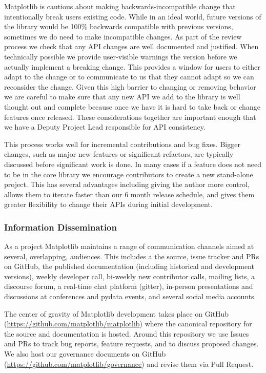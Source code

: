 \documentclass[12pt]{article}
\numberwithin{page}{section}
\begin{document}
Matplotlib is cautious about making backwards-incompatible change that
intentionally break users existing code.  While in an ideal world, future
versions of the library would be 100\% backwards compatible with previous
versions, sometimes we do need to make incompatible changes.  As part of the
review process we check that any API changes are well documented and justified.
When technically possible we provide user-visible warnings the version before
we actually implement a breaking change.  This provides a window for users to
either adapt to the change or to communicate to us that they cannot adapt so we
can reconsider the change.  Given this high barrier to changing or removing
behavior we are careful to make sure that any new API we add to the library is
well thought out and complete because once we have it is hard to take back or
change features once released.  These considerations together are important
enough that we have a Deputy Project Lead responsible for API consistency.

This process works well for incremental contributions and bug fixes.  Bigger
changes, such as major new features or significant refactors, are typically
discussed before significant work is done.  In many cases if a feature does not
need to be in the core library we encourage contributors to create a new
stand-alone project.  This has several advantages including giving the
author more control, allows them to iterate faster than our 6 month release
schedule, and gives them greater flexibility to change their APIs during
initial development.

\subsubsection{Information Dissemination}

As a project Matplotlib maintains a range of communication channels
aimed at several, overlapping, audiences.  This includes a
the source, issue tracker and PRs on GitHub,
the published documentation (including historical and development versions),
weekly developer call,
bi-weekly new contributor calls,
mailing lists,
a discourse forum,
a real-time chat platform (gitter),
in-person presentations and discussions at conferences and pydata events,
and several social media accounts.


The center of gravity of Matplotlib development takes place on GitHub
(\url{https://github.com/matplotlib/matplotlib}) where the canonical
repository for the source and documentation is hosted.  Around this
repository we use Issues and PRs to track bug reports, feature
requests, and to discuss proposed changes.  We also host our
governance documents on GitHub
(\url{https://github.com/matplotlib/governance}) and revise them via
Pull Request.
\end{document}
